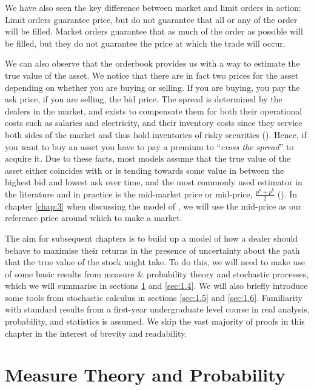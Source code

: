 We have also seen the key difference between market and limit orders in action: Limit 
orders guarantee price, but do not guarantee that all or any of the order will be 
filled. Market orders guarantee that as much of the order as possible will be filled, 
but they do not guarantee the price at which the trade will occur.

We can also observe that the orderbook provides us with a way to estimate the true value 
of the asset. We notice that there are in fact two prices for the asset depending on whether 
you are buying or selling. If you are buying, you pay the ask price, if you are selling,
the bid price. The spread is determined by the dealers in the market, and exists to compensate 
them for both their operational costs such as salaries and electricity, and their inventory 
costs since they service both sides of the market and thus hold inventories of risky
securities (\cite{trading}). Hence, if you want 
to buy an asset you have to pay a premium to ``\textit{cross the spread}'' to acquire 
it. Due to these facts, most models assume that the true value of the asset either 
coincides with or is tending towards some value in between the highest bid and lowest ask
over time, and the most commonly used estimator in the literature and in practice is 
the mid-market price or mid-price, $\frac{p^a+p^b}{2}$ (\cite{trading}). In chapter \ref{chap:3}
when discussing the model of \textcite{AS2008}, we will use the mid-price as our reference 
price around which to make a market.

The aim for subsequent chapters is to build up a model of how a dealer should 
behave to maximise their returns in the presence of uncertainty about the path that 
the true value of the stock might take. To do this, we 
will need to make use of some basic results from measure \& probability theory and 
stochastic processes, which we will summarise in sections \ref{sec:1.3} and \ref{sec:1.4}. 
We will also briefly introduce some tools from stochastic calculus in sections \ref{sec:1.5} 
and \ref{sec:1.6}. Familiarity with standard results from a 
first-year undergraduate level course in real analysis, probability, and statistics 
is assumed. We skip the vast majority of proofs in this chapter in the interest of 
brevity and readability.

\section{Measure Theory and Probability}\label{sec:1.3}

